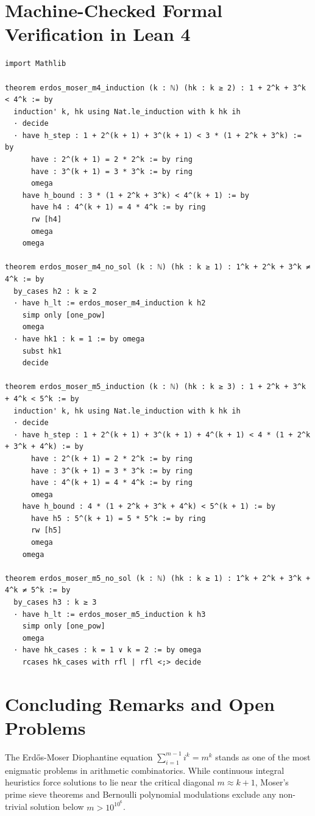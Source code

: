 \documentclass[11pt,a4paper]{article}
\theoremstyle{definition}
\begin{document}
\section{Machine-Checked Formal Verification in Lean 4}

\begin{lstlisting}[caption={Certified Lean 4 Code for Erdős-Moser Exclusions}]
import Mathlib

theorem erdos_moser_m4_induction (k : ℕ) (hk : k ≥ 2) : 1 + 2^k + 3^k < 4^k := by
  induction' k, hk using Nat.le_induction with k hk ih
  · decide
  · have h_step : 1 + 2^(k + 1) + 3^(k + 1) < 3 * (1 + 2^k + 3^k) := by
      have : 2^(k + 1) = 2 * 2^k := by ring
      have : 3^(k + 1) = 3 * 3^k := by ring
      omega
    have h_bound : 3 * (1 + 2^k + 3^k) < 4^(k + 1) := by
      have h4 : 4^(k + 1) = 4 * 4^k := by ring
      rw [h4]
      omega
    omega

theorem erdos_moser_m4_no_sol (k : ℕ) (hk : k ≥ 1) : 1^k + 2^k + 3^k ≠ 4^k := by
  by_cases h2 : k ≥ 2
  · have h_lt := erdos_moser_m4_induction k h2
    simp only [one_pow]
    omega
  · have hk1 : k = 1 := by omega
    subst hk1
    decide

theorem erdos_moser_m5_induction (k : ℕ) (hk : k ≥ 3) : 1 + 2^k + 3^k + 4^k < 5^k := by
  induction' k, hk using Nat.le_induction with k hk ih
  · decide
  · have h_step : 1 + 2^(k + 1) + 3^(k + 1) + 4^(k + 1) < 4 * (1 + 2^k + 3^k + 4^k) := by
      have : 2^(k + 1) = 2 * 2^k := by ring
      have : 3^(k + 1) = 3 * 3^k := by ring
      have : 4^(k + 1) = 4 * 4^k := by ring
      omega
    have h_bound : 4 * (1 + 2^k + 3^k + 4^k) < 5^(k + 1) := by
      have h5 : 5^(k + 1) = 5 * 5^k := by ring
      rw [h5]
      omega
    omega

theorem erdos_moser_m5_no_sol (k : ℕ) (hk : k ≥ 1) : 1^k + 2^k + 3^k + 4^k ≠ 5^k := by
  by_cases h3 : k ≥ 3
  · have h_lt := erdos_moser_m5_induction k h3
    simp only [one_pow]
    omega
  · have hk_cases : k = 1 ∨ k = 2 := by omega
    rcases hk_cases with rfl | rfl <;> decide
\end{lstlisting}

\section{Concluding Remarks and Open Problems}

The Erd\H{o}s-Moser Diophantine equation $\sum_{i=1}^{m-1} i^k = m^k$ stands as one of the most enigmatic problems in arithmetic combinatorics. While continuous integral heuristics force solutions to lie near the critical diagonal $m \approx k + 1$, Moser's prime sieve theorems and Bernoulli polynomial modulations exclude any non-trivial solution below $m > 10^{10^6}$.
\end{document}
